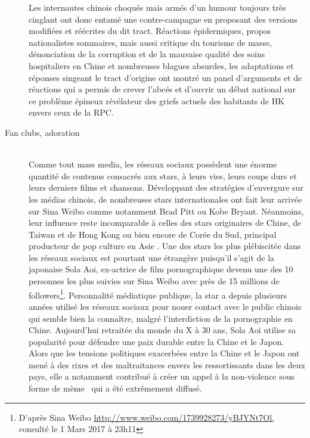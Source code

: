\begin{description}
Les internautes chinois choqu\'es mais arm\'es d{\textquoteright}un humour toujours tr\`es cinglant ont donc entam\'e une contre-campagne en proposant des versions modifi\'ees et r\'e\'ecrites du dit tract. R\'eactions \'epidermiques, propos nationalistes sommaires, mais aussi critique du tourisme de masse, d\'enonciation de la corruption et de la mauvaise qualit\'e des soins hospitaliers en Chine et nombreuses blagues absurdes, les adaptations et r\'eponses singeant le tract d{\textquoteright}origine ont montr\'e un panel d{\textquoteright}arguments et de r\'eactions qui a permis de crever l{\textquoteright}abc\'es et d{\textquoteright}ouvrir un d\'ebat national sur ce probl\`eme \'epineux r\'ev\'elateur des griefs actuels des habitants de HK envers ceux de la RPC.  


\item[Fan clubs, adoration]
\hfill \\
Comme tout mass media, les r\'eseaux sociaux poss\`edent une \'enorme quantit\'e de contenus consacr\'es aux stars, \`a leurs vies, leurs coups durs et leurs derniers films et chansons. D\'eveloppant des strat\'egies d{\textquoteright}envergure sur les m\'edias chinois, de nombreuses stars internationales ont fait leur arriv\'ee sur Sina Weibo comme notamment Brad Pitt ou Kobe Bryant. N\'eanmoins, leur influence reste incomparable \`a celles des stars originaires de Chine, de Taiwan et de Hong Kong ou bien encore de Cor\'ee du Sud, principal producteur de pop culture en Asie \citep{Martel2010}. Une des stars les plus pl\'ebiscit\'ee dans les r\'eseaux sociaux est pourtant une \'etrang\`ere puisqu{\textquoteright}il s{\textquoteright}agit de la japonaise Sola Aoi, ex-actrice de film pornographique devenu une des 10 personnes les plus suivies sur Sina Weibo avec pr\`es de 15 millions de followers\footnote{ D{\textquoteright}apr\`es Sina Weibo \url{http://www.weibo.com/1739928273/yBJYNt7Ol,} consult\'e le 1 Mars 2017 \`a 23h11}. Personnalit\'e m\'ediatique publique, la star a depuis plusieurs ann\'ees utilis\'e les r\'eseaux sociaux pour nouer contact avec le public chinois qui semble bien la conna\^itre, malgr\'e l{\textquoteright}interdiction de la pornographie en Chine. Aujourd{\textquoteright}hui retrait\'ee du monde du X \`a 30 ans, Sola Aoi utilise sa popularit\'e pour d\'efendre une paix durable entre la Chine et le Japon. Alors que les tensions politiques exacerb\'ees entre la Chine et le Japon ont men\'e \`a des rixes et des maltraitances envers les ressortissants dans les deux pays, elle a notamment contribu\'e \`a cr\'eer un appel \`a la non-violence sous forme de m\`eme \ qui a \'et\'e extr\^emement diffus\'e.  


\end{description}
